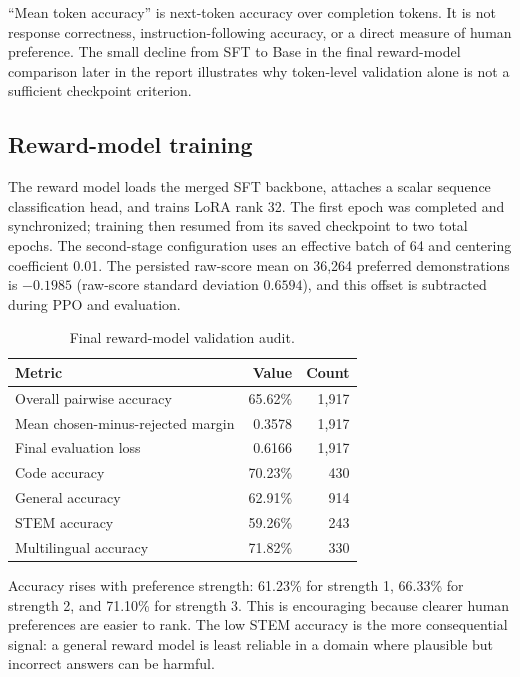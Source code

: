 \documentclass[11pt]{article}
\begin{document}
``Mean token accuracy'' is next-token accuracy over completion tokens. It is
not response correctness, instruction-following accuracy, or a direct measure
of human preference. The small decline from SFT to Base in the final
reward-model comparison later in the report illustrates why token-level
validation alone is not a sufficient checkpoint criterion.

\subsection{Reward-model training}

The reward model loads the merged SFT backbone, attaches a scalar sequence
classification head, and trains LoRA rank 32. The first epoch was completed
and synchronized; training then resumed from its saved checkpoint to two total
epochs. The second-stage configuration uses an effective batch of 64 and
centering coefficient 0.01. The persisted raw-score mean on 36,264 preferred
demonstrations is $-0.1985$ (raw-score standard deviation $0.6594$), and this
offset is subtracted during PPO and evaluation.

\begin{table}[H]
\centering
\caption{Final reward-model validation audit.}
\label{tab:rm}
\begin{tabular}{@{}lrr@{}}
\toprule
\textbf{Metric} & \textbf{Value} & \textbf{Count}\\
\midrule
Overall pairwise accuracy & 65.62\% & 1,917\\
Mean chosen-minus-rejected margin & 0.3578 & 1,917\\
Final evaluation loss & 0.6166 & 1,917\\
\midrule
Code accuracy & 70.23\% & 430\\
General accuracy & 62.91\% & 914\\
STEM accuracy & 59.26\% & 243\\
Multilingual accuracy & 71.82\% & 330\\
\bottomrule
\end{tabular}
\end{table}

Accuracy rises with preference strength: 61.23\% for strength 1,
66.33\% for strength 2, and 71.10\% for strength 3. This is encouraging
because clearer human preferences are easier to rank. The low STEM accuracy is
the more consequential signal: a general reward model is least reliable in a
domain where plausible but incorrect answers can be harmful.
\end{document}
